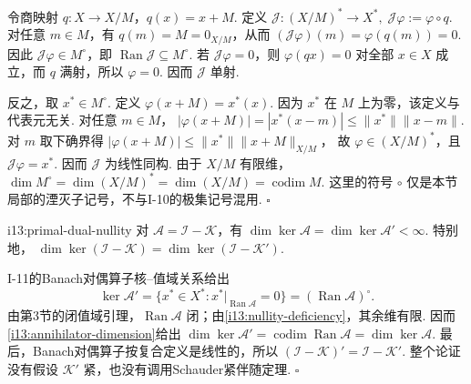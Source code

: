 \begin{FAProof}
令商映射 \(\displaystyle q:X\to X/M\)，\(\displaystyle q(x)=x+M\). 定义
\(\displaystyle \mathcal J:(X/M)^*\to X^*, \; \mathcal J\varphi := \varphi\circ q\).
对任意 \(\displaystyle m\in M\)，有 \(\displaystyle q(m)=M=0_{X/M}\)，从而 \(\displaystyle (\mathcal J\varphi)(m)=\varphi(q(m))=0\). 因此 \(\displaystyle \mathcal J\varphi\in M^\circ\)，即 \(\displaystyle \operatorname{Ran}\mathcal J\subseteq M^\circ\). 若 \(\displaystyle \mathcal J\varphi=0\)，则 \(\displaystyle \varphi(qx)=0\) 对全部 \(\displaystyle x\in X\) 成立，而 \(\displaystyle q\) 满射，所以 \(\displaystyle \varphi=0\). 因而 \(\displaystyle \mathcal J\) 单射.

反之，取 \(\displaystyle x^*\in M^\circ\). 定义 \(\displaystyle \varphi(x+M)=x^*(x)\). 因为 \(\displaystyle x^*\) 在 \(\displaystyle M\) 上为零，该定义与代表元无关. 对任意 \(\displaystyle m\in M\)，
\(\displaystyle |\varphi(x+M)| = |x^*(x-m)| \leqslant \|x^*\|\|x-m\|\).
对 \(\displaystyle m\) 取下确界得
\(\displaystyle |\varphi(x+M)| \leqslant \|x^*\|\|x+M\|_{X/M}\)，
故 \(\displaystyle \varphi\in(X/M)^*\)，且 \(\displaystyle \mathcal J\varphi=x^*\). 因而 \(\displaystyle \mathcal J\) 为线性同构. 由于 \(\displaystyle X/M\) 有限维，
\(\displaystyle \dim M^\circ = \dim(X/M)^* = \dim(X/M) = \operatorname{codim}M\).
这里的符号 \(\displaystyle \circ\) 仅是本节局部的湮灭子记号，不与I-10的极集记号混用.
\hfill\(\square\)
\end{FAProof}

\begin{FAProposition}[A][原算子与对偶算子的零化度相等]{i13:primal-dual-nullity}
对 \(\displaystyle \mathcal A=\mathcal I-\mathcal K\)，有
\(\displaystyle \dim\ker\mathcal A = \dim\ker\mathcal A' <\infty\).
特别地，
\(\displaystyle \dim\ker(\mathcal I-\mathcal K) = \dim\ker(\mathcal I-\mathcal K')\).
\end{FAProposition}

\begin{FAProof}
I-11的Banach对偶算子核--值域关系给出
\[
\ker\mathcal A'
=
\{x^*\in X^*:x^*|_{\operatorname{Ran}\mathcal A}=0\}
=
(\operatorname{Ran}\mathcal A)^\circ.
\]
由第3节的闭值域引理，\(\displaystyle \operatorname{Ran}\mathcal A\) 闭；由\autoref{i13:nullity-deficiency}，其余维有限. 因而\autoref{i13:annihilator-dimension}给出
\(\displaystyle \dim\ker\mathcal A' = \operatorname{codim}\operatorname{Ran}\mathcal A = \dim\ker\mathcal A\).
最后，Banach对偶算子按复合定义是线性的，所以 \(\displaystyle (\mathcal I-\mathcal K)'=\mathcal I-\mathcal K'\). 整个论证没有假设 \(\displaystyle \mathcal K'\) 紧，也没有调用Schauder紧伴随定理.
\hfill\(\square\)
\end{FAProof}

